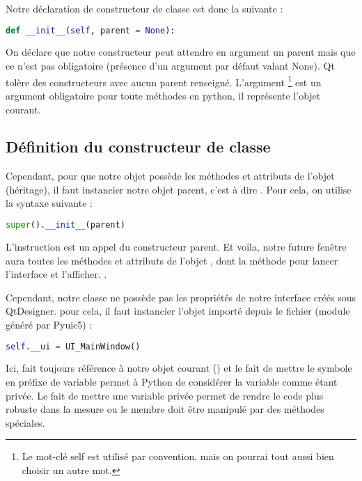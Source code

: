 Notre déclaration de constructeur de classe est donc la suivante : 

\begin{lstlisting}[language=Python]
    def __init__(self, parent = None):
\end{lstlisting}

On déclare que notre constructeur peut attendre en argument un parent mais que ce n'est pas obligatoire (présence d'un argument par défaut valant None). \newline Qt tolère des constructeurs avec aucun parent renseigné. \newline
L'argument \footnote{Le mot-clé self est utilisé par convention, mais on pourrai tout aussi bien choisir un autre mot.} est un argument obligatoire pour toute méthodes en python, il représente l'objet courant. 

\subsection{Définition du constructeur de classe}

Cependant, pour que notre objet possède les méthodes et attributs de l'objet  (héritage), il faut instancier notre objet parent, c'est à dire .
Pour cela, on utilise la syntaxe suivante : 
\begin{lstlisting}[language=Python]
        super().__init__(parent)
\end{lstlisting}
L'instruction  est un appel du constructeur parent. \newline
Et voila, notre future fenêtre aura toutes les méthodes et attributs de l'objet , dont la méthode pour lancer l'interface et l'afficher. \newline.

Cependant, notre classe  ne possède pas les propriétés de notre interface créés sous QtDesigner. pour cela, il faut instancier l'objet importé depuis le fichier  (module généré par Pyuic5) : 

\begin{lstlisting}[language=Python]
        self.__ui = UI_MainWindow()
\end{lstlisting}

Ici,  fait toujours référence à notre objet courant () et le fait de mettre le symbole \bold{\_\_} en préfixe de variable permet à Python de considérer la variable comme étant privée. \newline 
Le fait de mettre une variable privée permet de rendre le code plus robuste dans la mesure ou le membre doit être manipulé par des méthodes spéciales.\newline


